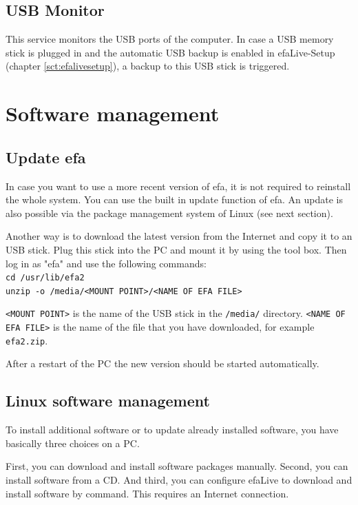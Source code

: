 \documentclass[a4paper,12pt,twoside]{article}
\begin{document}
\subsection{USB Monitor}
\label{sct:usb_monitor}
This service monitors the USB ports of the computer. In case a USB memory
stick is plugged in and the automatic USB backup is enabled in efaLive-Setup
(chapter \ref{sct:efalivesetup}), a backup to this USB stick is triggered.


\section{Software management}
\label{sct:software_management}
\subsection{Update efa}
\label{sct:update_efa}
In case you want to use a more recent version of efa, it is not required
to reinstall the whole system. You can use the built in update function
of efa. An update is also possible via the package management system of Linux
(see next section).

Another way is to download the latest version from the Internet
\cite{EFA1} and copy it to an USB stick. Plug this stick into the PC
and mount it by using the tool box. Then log in as
"efa" and use the following commands:
\bigskip
\\
\texttt{cd /usr/lib/efa2\\
unzip -o /media/{\textless}MOUNT POINT{\textgreater}/{\textless}NAME OF
EFA FILE{\textgreater}}

\bigskip
\texttt{{\textless}MOUNT POINT{\textgreater}} is the name of the USB stick in the
\texttt{/media/} directory. \texttt{{\textless}NAME OF EFA FILE{\textgreater}} is the
name of the file that you have downloaded, for example
\texttt{efa2.zip}.

After a restart of the PC the new version should be started
automatically.


\subsection{Linux software management}
\label{sct:linux_software}
To install additional software or to update already installed software,
you have basically three choices on a PC.

First, you can download and install software packages manually. Second,
you can install software from a CD. And third, you can configure
efaLive to download and install software by command. This requires an
Internet connection.
\end{document}
